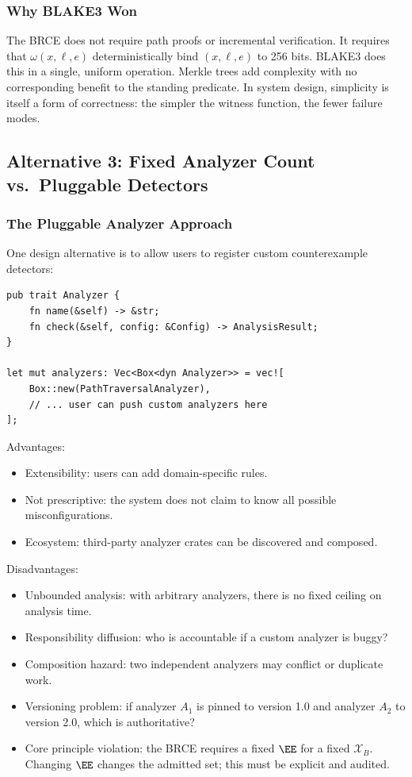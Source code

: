 \subsubsection{Why BLAKE3 Won}

The BRCE does not require path proofs or incremental verification. It requires that $\omega(x,\ell,e)$ deterministically bind $(x,\ell,e)$ to 256 bits. BLAKE3 does this in a single, uniform operation. Merkle trees add complexity with no corresponding benefit to the standing predicate. In system design, simplicity is itself a form of correctness: the simpler the witness function, the fewer failure modes.

\subsection{Alternative 3: Fixed Analyzer Count vs.\ Pluggable Detectors}

\subsubsection{The Pluggable Analyzer Approach}

One design alternative is to allow users to register custom counterexample detectors:

\begin{lstlisting}[caption={Pluggable analyzer architecture}]
pub trait Analyzer {
    fn name(&self) -> &str;
    fn check(&self, config: &Config) -> AnalysisResult;
}

let mut analyzers: Vec<Box<dyn Analyzer>> = vec![
    Box::new(PathTraversalAnalyzer),
    // ... user can push custom analyzers here
];
\end{lstlisting}

Advantages:
\begin{itemize}
  \item Extensibility: users can add domain-specific rules.
  \item Not prescriptive: the system does not claim to know all possible misconfigurations.
  \item Ecosystem: third-party analyzer crates can be discovered and composed.
\end{itemize}

Disadvantages:
\begin{itemize}
  \item Unbounded analysis: with arbitrary analyzers, there is no fixed ceiling on analysis time.
  \item Responsibility diffusion: who is accountable if a custom analyzer is buggy?
  \item Composition hazard: two independent analyzers may conflict or duplicate work.
  \item Versioning problem: if analyzer $A_1$ is pinned to version 1.0 and analyzer $A_2$ to version 2.0, which is authoritative?
  \item Core principle violation: the BRCE requires a fixed $\EE$ for a fixed $\mathcal{X}_B$. Changing $\EE$ changes the admitted set; this must be explicit and audited.
\end{itemize}

